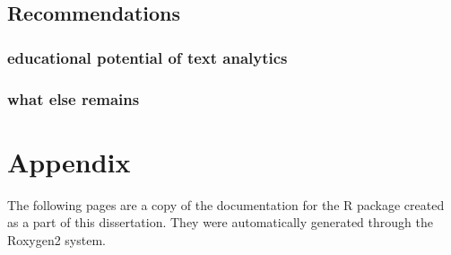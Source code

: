 \documentclass[11pt, a4paper, oneside]{report}
\begin{document}
\section{Recommendations}\label{sec:recommendations}

\subsection{educational potential of text analytics}
\subsection{what else remains}

\chapter{Appendix}\label{cha:appendix}

The following pages are a copy of the documentation for the R package
created as a part of this dissertation. They were automatically
generated through the Roxygen2 system.



{}
\printglossaries
{}
\printindex
{}
\printbibliography
\end{document}
